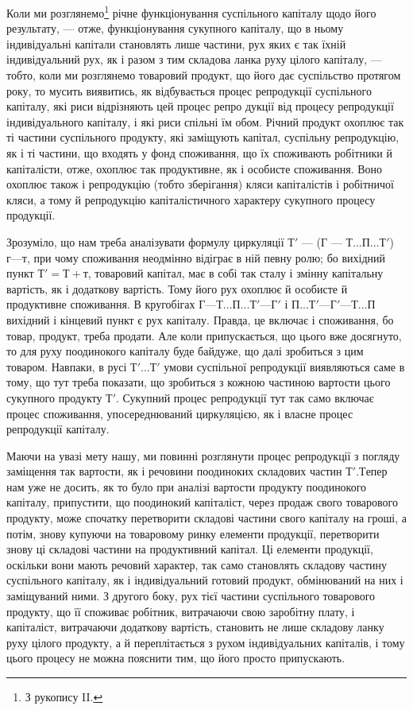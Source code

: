 Коли ми розглянемо\footnote{
З рукопису II.
} річне функціонування суспільного капіталу щодо
його результату, — отже, функціонування сукупного капіталу, що в ньому
індивідуальні капітали становлять лише частини, рух яких є так їхній
індивідуальний рух, як і разом з тим складова ланка руху цілого капіталу,
— тобто, коли ми розглянемо товаровий продукт, що його дає суспільство
протягом року, то мусить виявитись, як відбувається процес
репродукції суспільного капіталу, які риси відрізняють цей процес репро
дукції від процесу репродукції індивідуального капіталу, і які риси
спільні їм обом. Річний продукт охоплює так ті частини суспільного
продукту, які заміщують капітал, суспільну репродукцію, як і ті частини,
що входять у фонд споживання, що їх споживають робітники й капіталісти,
отже, охоплює так продуктивне, як і особисте споживання. Воно
охоплює також і репродукцію (тобто зберігання) кляси капіталістів і
робітничої кляси, а тому й репродукцію капіталістичного характеру сукупного
процесу продукції.

Зрозуміло, що нам треба аналізувати формулу циркуляції
$Т'$ — (Г — $Т... П... Т'$) $г — т$, при чому споживання неодмінно відіграє в ній
певну ролю; бо вихідний пункт $Т' = Т + т$, товаровий капітал, має в
собі так сталу і змінну капітальну вартість, як і додаткову вартість.
Тому його рух охоплює й особисте й продуктивне споживання. В кругобігах
$Г — Т... П... Т' — Г'$ і $П... Т' — Г' — Т... П$ вихідний і кінцевий
пункт є рух капіталу. Правда, це включає і споживання, бо товар,
продукт, треба продати. Але коли припускається, що цього вже досягнуто,
то для руху поодинокого капіталу буде байдуже, що далі зробиться
з цим товаром. Навпаки, в русі $Т'... Т'$ умови суспільної репродукції
виявляються саме в тому, що тут треба показати, що зробиться з кожною
частиною вартости цього сукупного продукту $Т'$. Сукупний процес
репродукції тут так само включає процес споживання, упосереднюваний
циркуляцією, як і власне процес репродукції капіталу.

Маючи на увазі мету нашу, ми повинні розглянути процес репродукції
з погляду заміщення так вартости, як і речовини поодиноких складових
частин $Т'. Т$епер нам уже не досить, як то було при аналізі вартости
продукту поодинокого капіталу, припустити, що поодинокий
капіталіст, через продаж свого товарового продукту, може спочатку перетворити
складові частини свого капіталу на гроші, а потім, знову купуючи
на товаровому ринку елементи продукції, перетворити знову ці
складові частини на продуктивний капітал. Ці елементи продукції, оскільки
вони мають речовий характер, так само становлять складову частину
суспільного капіталу, як і індивідуальний готовий продукт, обмінюваний
на них і заміщуваний ними. З другого боку, рух тієї частини суспільного
товарового продукту, що її споживає робітник, витрачаючи свою
заробітну плату, і капіталіст, витрачаючи додаткову вартість, становить не
лише складову ланку руху цілого продукту, а й переплітається з рухом
індивідуальних капіталів, і тому цього процесу не можна пояснити тим,
що його просто припускають.

